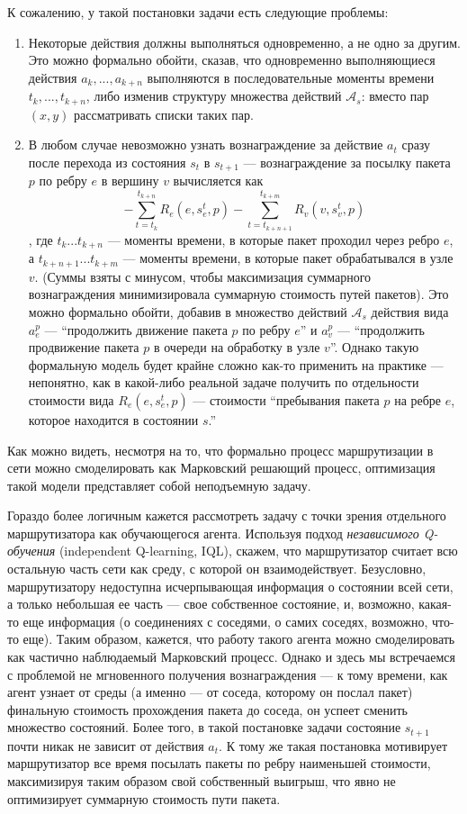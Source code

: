 \documentclass[specification, annotation]{itmo-student-thesis}
\begin{document}
К сожалению, у такой постановки задачи есть следующие проблемы:
\begin{enumerate}
\item Некоторые действия должны выполняться одновременно, а не одно за другим.
  Это можно формально обойти, сказав, что одновременно выполняющиеся действия
  $a_k, ... , a_{k+n}$ выполняются в последовательные моменты времени
  $t_k, ... , t_{k+n}$, либо изменив структуру множества действий
  $\mathcal{A}_s$: вместо пар $(x, y)$ рассматривать списки таких пар.
\item В любом случае невозможно узнать вознаграждение за действие $a_t$ сразу
  после перехода из состояния $s_t$ в $s_{t+1}$ --- вознаграждение за посылку
  пакета $p$ по ребру $e$ в вершину $v$ вычисляется как
  \[
  - \sum\limits_{t=t_k}^{t_{k+n}} {R_e(e, s_e^t, p)} -
  \sum\limits_{t=t_{k+n+1}}^{t_{k+m}} R_v(v, s_v^t, p)
  \]
  , где $t_k ... t_{k+n}$ --- моменты времени, в которые пакет проходил через
  ребро $e$, а $t_{k+n+1} ... t_{k+m}$ --- моменты времени, в которые пакет
  обрабатывался в узле $v$. (Суммы взяты с минусом, чтобы максимизация
  суммарного вознаграждения минимизировала суммарную стоимость путей пакетов).
  Это можно формально обойти, добавив в множество действий $\mathcal{A}_s$
  действия вида $a_e^p$ --- ``продолжить движение пакета
  $p$ по ребру $e$'' и $a_v^p$ --- ``продолжить продвижение пакета $p$ в очереди на
  обработку в узле $v$''. Однако такую формальную модель будет крайне сложно
  как-то применить на практике --- непонятно, как в какой-либо реальной задаче
  получить по отдельности стоимости вида $R_e(e, s_e^t, p)$ --- стоимости
  ``пребывания пакета $p$ на ребре $e$, которое находится в состоянии $s$.''
\end{enumerate}

Как можно видеть, несмотря на то, что формально процесс маршрутизации в сети
можно смоделировать как Марковский решающий процесс, оптимизация такой модели
представляет собой неподъемную задачу.

Гораздо более логичным кажется рассмотреть задачу с точки зрения отдельного
маршрутизатора как обучающегося агента. Используя подход \textit{независимого
  Q-обучения} (independent Q-learning, IQL)\cite{tan1993multi}, скажем, что
маршрутизатор считает всю остальную часть сети как среду, с которой он
взаимодействует. Безусловно, маршрутизатору недоступна исчерпывающая информация
о состоянии всей сети, а только небольшая ее часть --- свое собственное
состояние, и, возможно, какая-то еще информация (о соединениях с соседями, о
самих соседях, возможно, что-то еще). Таким образом, кажется, что работу такого
агента можно смоделировать как частично наблюдаемый Марковский процесс. Однако и
здесь мы встречаемся с проблемой не мгновенного получения вознаграждения --- к
тому времени, как агент узнает от среды (а именно --- от соседа, которому он
послал пакет) финальную стоимость прохождения пакета до соседа, он успеет
сменить множество состояний. Более того, в такой постановке задачи состояние
$s_{t+1}$ почти никак не зависит от действия $a_t$. К тому же такая постановка
мотивирует маршрутизатор все время посылать пакеты по ребру наименьшей
стоимости, максимизируя таким образом свой собственный выигрыш, что явно не
оптимизирует суммарную стоимость пути пакета.
\end{document}
